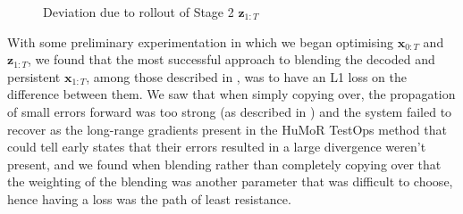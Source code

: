\begin{figure}
    \centering
    \hfil
    \hfil
    \hfil
    \caption{Deviation due to rollout of Stage 2 $\mathbf{z}_{1:T}$}
    \label{fig:humor_stage_2_rollout_deviation}
\end{figure}


With some preliminary experimentation in which we began optimising $\mathbf{x}_{0:T}$ and $\mathbf{z}_{1:T}$, we found that the most successful approach to blending the decoded and persistent  $\mathbf{x}_{1:T}$, among those described in , was to have an L1 loss on the difference between them. We saw that when simply copying over, the propagation of small errors forward was too strong (as described in ) and the system failed to recover as the long-range gradients present in the HuMoR TestOps method that could tell early states that their errors resulted in a large divergence weren't present, and we found when blending rather than completely copying over that the weighting of the blending was another parameter that was difficult to choose, hence having a loss was the path of least resistance.

